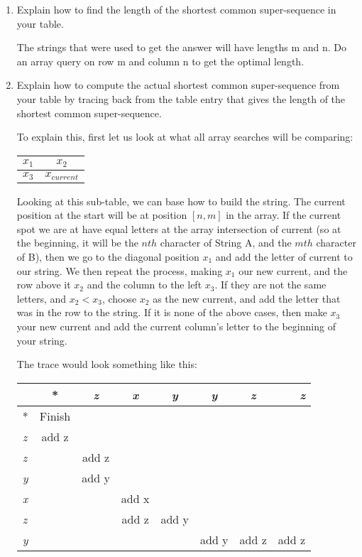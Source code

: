 \documentclass{article}
\begin{document}
\begin{enumerate}
\begin{enumerate}
\item Explain how to find the length of the shortest common super-sequence in your table.

The strings that were used to get the answer will have lengths m and n. Do an array query on row m and column n to get the optimal length.
\newline

\item Explain how to compute the actual shortest common super-sequence from your table by tracing back from the table entry that gives the length of the shortest common super-sequence. 
\newline

To explain this, first let us look at what all array searches will be comparing:

\begin{tabular}{ l | c}
$x_{1}$ & $x_{2}$ \\ \hline
$x_{3}$ & $x_{current}$
\end{tabular}
Looking at this sub-table, we can base how to build the string. The current position at the start will be at position $[n,m]$ in the array. If the current spot we are at have equal letters at the array intersection of current (so at the beginning, it will be the $nth$ character of String A, and the $mth$ character of B), then we go to the diagonal position $x_{1}$ and add the letter of current to our string. We then repeat the process, making $x_{1}$ our new current, and the row above it $x_{2}$ and the column to the left $x_{3}$. If they are not the same letters, and $x_{2} < x_{3}$, choose $x_{2}$ as the new current, and add the letter that was in the row to the string. If it is none of the above cases, then make $x_{3}$ your new current and add the current column's letter to the beginning of your string.

The trace would look something like this: 

\begin{tabular}{| l | c | c | c | c | c | c | r | }
\hline
   	& * & \textit{z} & \textit{x} & \textit{y} & \textit{y} & \textit{z} & \textit{z} \\ \hline
  * 	& \cellcolor[gray]{0.8} Finish &   &   &   &   &   &   \\ \hline
\textit{z} & \cellcolor[gray]{0.8} add z &   &   &   &   &   &   \\ \hline
\textit{z} &   & \cellcolor[gray]{0.8} add z &   &   &   &   &   \\ \hline
\textit{y} &   & \cellcolor[gray]{0.8} add y &   &   &   &   &   \\ \hline
\textit{x} &   &   & \cellcolor[gray]{0.8} add x &   &   &   &   \\ \hline
\textit{z} &   &   & \cellcolor[gray]{0.8} add z & \cellcolor[gray]{0.8} add y &   &   &   \\ \hline
\textit{y} &   &   &   &   & \cellcolor[gray]{0.8}
 add y & \cellcolor[gray]{0.8} add z & \cellcolor[gray]{0.8} add z \\ \hline
\end{tabular}


\end{enumerate}
\end{enumerate}
\end{document}
